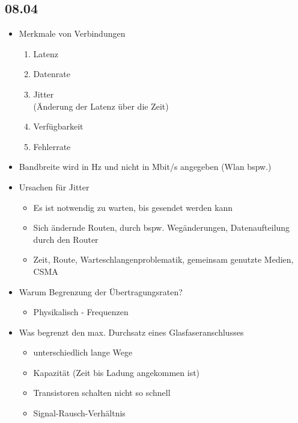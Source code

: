 \documentclass{article} %
\begin{document}
\subsection{08.04}
	\begin{itemize}
		\item Merkmale von Verbindungen
		\begin{enumerate}
			\item Latenz
			\item Datenrate
			\item Jitter\\
			(Änderung der Latenz über die Zeit)
			\item Verfügbarkeit
			\item Fehlerrate
		\end{enumerate}
		\item Bandbreite wird in Hz und nicht in Mbit/s angegeben (Wlan bspw.)
		\item Ursachen für Jitter
			\begin{itemize}
				\item Es ist notwendig zu warten, bis gesendet werden kann
				\item Sich ändernde Routen, durch bspw. Wegänderungen, Datenaufteilung durch den Router
				\item Zeit, Route, Warteschlangenproblematik, gemeinsam genutzte Medien, CSMA
			\end{itemize}
		\item Warum Begrenzung der Übertragungsraten?
			\begin{itemize}
				\item Physikalisch - Frequenzen
			\end{itemize}
		\item Was begrenzt den max. Durchsatz eines Glasfaseranschlusses
			\begin{itemize}
				\item unterschiedlich lange Wege
				\item Kapazität (Zeit bis Ladung angekommen ist)
				\item Transistoren schalten nicht so schnell
				\item Signal-Rausch-Verhältnis
			\end{itemize}
	\end{itemize}
\end{document}
